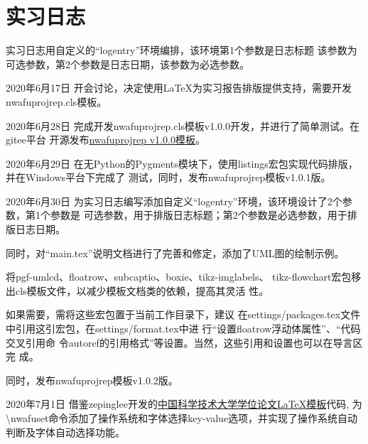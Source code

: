 \documentclass[
  ]{nwafuprojrep}
\begin{document}
\section{实习日志}
实习日志用自定义的\enquote{logentry}环境编排，该环境第1个参数是日志标题
该参数为可选参数，第2个参数是日志日期，该参数为必选参数。
\begin{logentry}[会议讨论]{2020年6月17日}
  开会讨论，决定使用\LaTeX{}为实习报告排版提供支持，需要开发
  {nwafuprojrep.cls}模板。
\end{logentry}
\begin{logentry}[完成开发]{2020年6月28日}
  完成开发{nwafuprojrep.cls}模板v1.0.0开发，并进行了简单测试。在gitee平台
  开源发布\href{https://gitee.com/registor/nwafuprojrep}{nwafuprojrep v1.0.0模板}。  
\end{logentry}

\begin{logentry}[修正无Python的Pygments下代码排版问题]{2020年6月29日}
  在无Python的Pygments模块下，使用listings宏包实现代码排版，并在Windows平台下完成了
  测试，同时，发布nwafuprojrep模板v1.0.1版。  
\end{logentry}

\begin{logentry}{2020年6月30日}
  为实习日志编写添加自定义\enquote{logentry}环境，该环境设计了2个参数，第1个参数是
  可选参数，用于排版日志标题；第2个参数是必选参数，用于排版日志日期。  
  
  同时，对\enquote{main.tex}说明文档进行了完善和修定，添加了UML图的绘制示例。
  
  将pgf-umlcd、floatrow、subcaptio、boxie、tikz-imglabels、
  tikz-flowchart宏包移出cls模板文件，以减少模板文档类的依赖，提高其灵活
  性。
  
  如果需要，需将这些宏包置于当前工作目录下，建议
  在settings/packages.tex文件中引用这引宏包，在settings/format.tex中进
  行\enquote{设置floatrow浮动体属性}、\enquote{代码交叉引用命
    令autoref的引用格式}等设置。当然，这些引用和设置也可以在导言区完
  成。

  同时，发布nwafuprojrep模板v1.0.2版。
\end{logentry}

\begin{logentry}[添加操作系统及字体判断功能]{2020年7月1日}
  借鉴zepinglee开发的\href{https://github.com/ustctug/ustcthesis}{中国科学技术大学学位论文\LaTeX{}模板}代码, 为\textbackslash{}nwafuset命令添加了操作系统和字体选择key-value选项，并实现了操作系统自动判断及字体自动选择功能。
\end{logentry}
\end{document}

